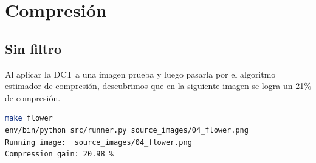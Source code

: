 \documentclass[spanish]{scrartcl}
\begin{document}
\section{Compresión}
\subsection{Sin filtro}

Al aplicar la DCT a una imagen prueba y luego pasarla por el algoritmo estimador de compresión, descubrimos que en la siguiente imagen se logra un 21\% de compresión.
\begin{lstlisting}[language=bash]
make flower
env/bin/python src/runner.py source_images/04_flower.png
Running image:  source_images/04_flower.png
Compression gain: 20.98 %
\end{lstlisting}
\end{document}
